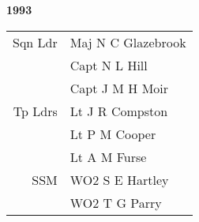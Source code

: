 \begin{center}
  \Huge
  \textbf{1993}
\end{center}

\begin{center}
  \small
  \begin{tabular}{rl}
    Sqn Ldr & Maj N C Glazebrook \\
      & Capt N L Hill \\
      & Capt J M H Moir \\
    Tp Ldrs & Lt J R Compston \\
      & Lt P M Cooper \\
      & Lt A M Furse \\
    SSM & WO2 S E Hartley \\
      & WO2 T G Parry \\
  \end{tabular}
\end{center}

